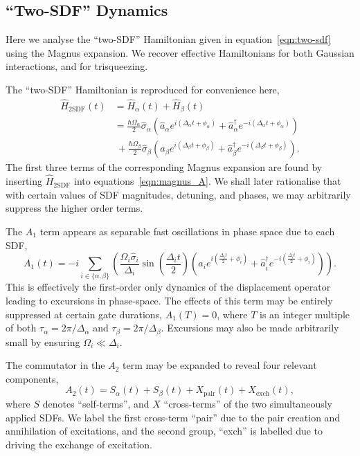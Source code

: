 \subsection{``Two-SDF'' Dynamics}
\label{app:two-sdf}
    Here we analyse the ``two-SDF'' Hamiltonian given in equation~\ref{eqn:two-sdf} using the Magnus expansion. We recover effective Hamiltonians for both Gaussian interactions, and for trisqueezing. 

    The ``two-SDF'' Hamiltonian is reproduced for convenience here,
    \begin{subequations}
    \begin{align}
      \hat H_\mathrm{2SDF}(t)  &= \hat H_\alpha(t) + \hat H_\beta(t)\\
      &=
      \frac{\hbar \Omega_\alpha}{2}\hat\sigma_\alpha \left(\hat a_\alpha e^{i(\Delta_\alpha t + \phi_\alpha)} + \hat a_\alpha^\dagger e^{-i(\Delta _\alpha t + \phi_\alpha )}\right)\\
      &~+ 
      \frac{\hbar \Omega_{\beta}}{2}\hat\sigma_{\beta} \left(\hat a_\beta e^{i(\Delta_\beta t + \phi_\beta)} + \hat a_\beta^\dagger e^{-i(\Delta_\beta t + \phi_\beta)}\right).
    \end{align}
\end{subequations}
    The first three terms of the corresponding Magnus expansion are found by inserting $\hat H_\mathrm{2SDF}$ into equations~\ref{eqn:magnus_A}. We shall later rationalise that with certain values of SDF magnitudes, detuning, and phases, we may arbitrarily suppress the higher order terms.

    The $A_1$ term appears as separable fast
    oscillations in phase space due to each SDF, 
    \begin{equation}
        A_1(t) = -i\sum_{i\in\{\alpha,\beta\}}\left(\frac{\Omega_i\hat\sigma_i}{\Delta_i}\sin\left(\frac{\Delta_i t}{2}\right)
        \left(\hat a_i e^{i\left(\frac{\Delta_i t}{2} + \phi_i \right)} + \hat a_i^\dagger e^{-i\left(\frac{\Delta_i t}{2} + \phi_i \right)}
        \right)\right).
    \end{equation}
    This is effectively the first-order only dynamics of the displacement operator leading to excursions in phase-space. The effects of this term may be entirely suppressed at certain gate durations, $A_1(T)=0$, where $T$ is an integer multiple of both
    $\tau_\alpha = 2\pi/\Delta_\alpha$ and $\tau_\beta = 2\pi/\Delta_\beta$. Excursions may also be made arbitrarily small by ensuring $\Omega_i \ll \Delta_i$. 

    The commutator in the $A_2$ term may be expanded to reveal four relevant components,
    \begin{equation}
    A_2(t) = S_\alpha(t) + S_\beta(t) + X_\mathrm{pair}(t) + X_\mathrm{exch}(t),
    \end{equation}
    where $S$ denotes ``self-terms'', and $X$ ``cross-terms'' of the two simultaneously applied SDFs.
    We label the first cross-term ``pair'' due to the pair creation and annihilation of excitations, and the second group, ``exch'' is labelled due to driving the exchange of excitation. 


